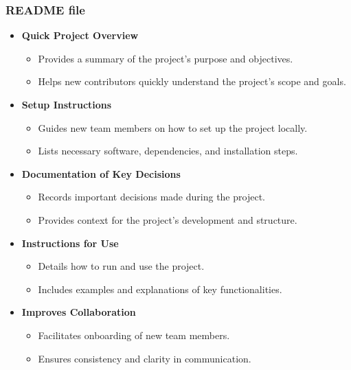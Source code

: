 \documentclass[aspectratio=169]{beamer}
\begin{document}
 \begin{frame}
\frametitle{README file}
\begin{itemize}
    \item \textbf{Quick Project Overview}
    \begin{itemize}
        \item Provides a summary of the project's purpose and objectives.
        \item Helps new contributors quickly understand the project's scope and goals.
    \end{itemize}
    \item \textbf{Setup Instructions}
    \begin{itemize}
        \item Guides new team members on how to set up the project locally.
        \item Lists necessary software, dependencies, and installation steps.
    \end{itemize}
    \item \textbf{Documentation of Key Decisions}
    \begin{itemize}
        \item Records important decisions made during the project.
        \item Provides context for the project's development and structure.
    \end{itemize}
    \item \textbf{Instructions for Use}
    \begin{itemize}
        \item Details how to run and use the project.
        \item Includes examples and explanations of key functionalities.
    \end{itemize}
    \item \textbf{Improves Collaboration}
    \begin{itemize}
        \item Facilitates onboarding of new team members.
        \item Ensures consistency and clarity in communication.
    \end{itemize}
\end{itemize}
\end{frame}
\end{document}
